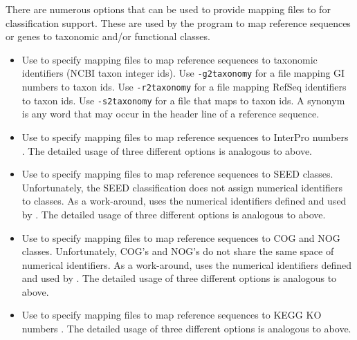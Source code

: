 \documentclass[11pt]{article}
\begin{document}
There are numerous options that can be used to provide mapping files to  for classification support.
These are used
by the program to map reference sequences or genes to taxonomic and/or functional classes.
\begin{itemize}
\setlength{\itemindent}{30pt}
\item[\itt{-g2taxonomy}]   Use to specify mapping files to map reference sequences to taxonomic identifiers (NCBI taxon integer ids).
Use {\tt -g2taxonomy} for a file mapping GI numbers to taxon ids. Use {\tt -r2taxonomy} for a file mapping RefSeq identifiers to taxon ids.
Use {\tt -s2taxonomy} for a file that maps  to taxon ids. A synonym is any word that may occur in
the header line of a reference sequence.
\item[\itt{-g2interpro2go}]   Use to specify mapping files to map reference sequences to InterPro numbers  \cite{GeneOntology2000,Mitchell2015} .
The detailed usage of three different options is analogous to above.
\item[\itt{-g2seed}]   Use to specify mapping files to map reference sequences to SEED \cite{SEED2005} classes.
Unfortunately, the SEED classification does not assign numerical identifiers to classes. As a work-around,
 uses the numerical identifiers defined and used by  \cite{MEGAN2011}.
The detailed usage of three different options is analogous to above.
\item[\itt{-g2eggnog}]   Use to specify mapping files to map reference sequences to COG and NOG \cite{Tatusov1997,eggNOG} classes.
Unfortunately,  COG's and NOG's do not share the same space of numerical identifiers. As a work-around,
 uses the numerical identifiers defined and used by  \cite{MEGAN2011}.
The detailed usage of three different options is analogous to above.
\item[\itt{-g2kegg}]   Use to specify mapping files to map reference sequences to KEGG KO numbers  \cite{Kanehisa2000} .
The detailed usage of three different options is analogous to above.
\end{itemize}
\end{document}
